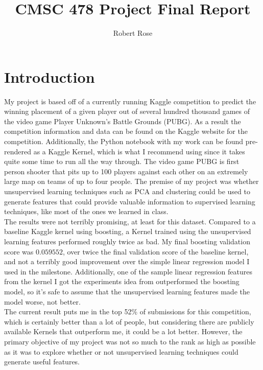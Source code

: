 \documentclass[11pt]{article}
\title{CMSC 478 Project Final Report}
\author{Robert Rose}
\makeatletter
\let\inserttitle\@title
\let\insertauthor\@author
\makeatother
\begin{document}
\begin{center}
  \LARGE{\inserttitle}

  \Large{\insertauthor}
\end{center}

\section{Introduction}

My project is based off of a currently running Kaggle competition to predict the winning placement of a
given player out of several hundred thousand games of the video game Player Unknown's Battle Grounds 
(PUBG). As a result the competition information and data can be found on  the Kaggle website for the 
competition.\cite{competition} Additionally, the Python notebook with my work can be found pre-rendered 
as a Kaggle Kernel, which is what I recommend using since it takes quite some time to run all the way 
through.\cite{clustering} The video game PUBG is first person shooter that pits up to 100 players against
each other on an extremely large map on teams of up to four people. The premise of my project was whether
unsupervised learning techniques such as PCA and clustering could be used to generate features that could
provide valuable information to supervised learning techniques, like most of the ones we learned in class.\\

The results were not terribly promising, at least for this dataset. Compared to a baseline Kaggle kernel 
using boosting, a Kernel trained using the unsupervised learning features performed roughly twice as
bad.\cite{baseline-lgbm} My final boosting validation score was $0.059552$, over twice the final validation
score of the baseline kernel, and not a terribly good improvement over the simple linear regression model
I used in the milestone. Additionally, one of the sample linear regression features from the kernel I got
the experiments idea from outperformed the boosting model, so it's safe to assume that the unsupervised
learning features made the model worse, not better.\cite{feature-engineering}\\

The current result puts me in the top 52\% of submissions for this competition, which is certainly better 
than a lot of people, but considering there are publicly available Kernels that outperform me, it could be
a lot better. However, the primary objective of my project was not so much to the rank as high as possible 
as it was to explore whether or not unsupervised learning techniques could generate useful features.
\end{document}
